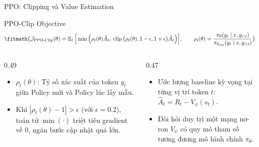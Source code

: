 \begin{frame}{PPO: Clipping và Value Estimation}
  \begin{block}{PPO-Clip Objective}
    \[
      \fitmath{%
      \mathcal{J}_{\text{PPO-Clip}}(\theta) = \E_{t} \Big[ \min \Big( \rho_t(\theta) \hat{A}_t, \; \clip\big(\rho_t(\theta), 1 - \epsilon, 1 + \epsilon\big) \hat{A}_t \Big) \Big],
      \qquad \rho_t(\theta) = \frac{\pi_\theta(y_t \mid x, y_{<t})}{\pi_{\theta_{\text{old}}}(y_t \mid x, y_{<t})}
      }
    \]
  \end{block}

  \begin{columns}[T,onlytextwidth]
    \begin{column}{0.49\textwidth}
      \small
      \begin{itemize}\setlength{\itemsep}{4pt}
        \item $\rho_t(\theta)$: Tỷ số xác suất của token $y_t$ giữa Policy mới và Policy lúc lấy mẫu.
        \item Khi $|\rho_t(\theta) - 1| > \epsilon$ (với $\epsilon = 0.2$), toán tử $\min(\cdot)$ triệt tiêu gradient về $0$, ngăn bước cập nhật quá lớn.
      \end{itemize}
    \end{column}
    \begin{column}{0.47\textwidth}
      \small
      \begin{itemize}\setlength{\itemsep}{4pt}
        \item Ước lượng baseline kỳ vọng tại từng vị trí token $t$: $\hat{A}_t = R_t - V_\psi(s_t)$.
        \item Đòi hỏi duy trì một mạng nơ-ron $V_\psi$ có quy mô tham số tương đương mô hình chính $\pi_\theta$.
      \end{itemize}
    \end{column}
  \end{columns}
  \par\vspace{0pt}
\end{frame}

